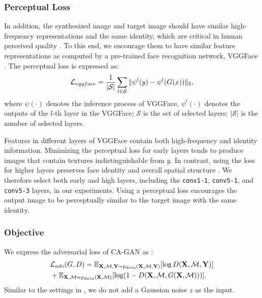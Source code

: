 \documentclass[journal]{IEEEtran}
\begin{document}
\subsubsection{Perceptual Loss}
\label{sec:lid}

In addition, the synthesized image and target image should have similar high-frequency representations and the same identity, which are critical in human perceived quality \cite{Gao2016Biologically, Gao2018Blind}. To this end, we encourage them to have similar feature representations  \cite{Johnson2016Perceptual} as computed by a pre-trained face recognition network, VGGFace \cite{Parkhi15VGGFace}. The perceptual loss is expressed as:
\begin{equation}
\label{eq:lid}
\begin{aligned}
\mathcal{L}_{vggface} = \frac{1}{\lvert \mathcal{S} \rvert} \sum_{l \in \mathcal{S}} \Arrowvert \psi^l(y) - \psi^l(G(x)) \Arrowvert_2,
\end{aligned}
\end{equation}
where $\psi(\cdot)$ denotes the inference process of VGGFace, $\psi^l(\cdot)$ denotes the outputs of the $l$-th layer in the VGGFace; $\mathcal{S}$ is the set of selected layers; $\lvert \mathcal{S} \rvert$ is the number of selected layers. 

Features in different layers of VGGFace contain both high-frequency and identity information. 
Minimizing the perceptual loss for early layers tends to produce images that contain textures indistinguishable from $y$. In contrast, using the loss for higher layers preserves face identity and overall spatial structure \cite{Johnson2016Perceptual}. 
We therefore select both early and high layers, including the \texttt{conv1-1}, \texttt{conv5-1}, and \texttt{conv5-3} layers, in our experiments. 
Using a perceptual loss encourages the output image to be perceptually similar to the target image with the same identity.


\subsubsection{Objective}
\label{sec:objective}

We express the adversarial loss of CA-GAN as \cite{Isola2017Pix2Pix}:
\begin{equation}
\label{eq:ladv}
\begin{aligned}
& \mathcal{L}_{adv}(G, D) = \mathbb{E}_{\mathbf{X}, \mathcal{M},\mathbf{Y} \thicksim p_{data}(\mathbf{X},\mathcal{M},\mathbf{Y})}[\log D(\mathbf{X}, \mathcal{M},\mathbf{Y})] \\
& + \mathbb{E}_{\mathbf{\mathbf{X},\mathcal{M}} \thicksim p_{data}(\mathbf{X},\mathcal{M})}[\log (1-D(\mathbf{X}, \mathcal{M}, G(\mathbf{X}, \mathcal{M})))].
\end{aligned}
\end{equation}
Similar to the settings in \cite{Isola2017Pix2Pix}, we do not add a Gaussian noise $z$ as the input. 
\end{document}

